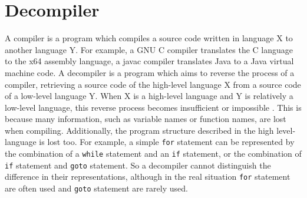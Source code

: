 \documentclass[senior,final,11pt]{iscs-thesis}
\begin{document}
\section{Decompiler}


A compiler is a program which compiles a source code written in language X to another language Y. 
For example, a GNU C compiler translates the C language to the x64 assembly language, a javac compiler translates Java to a Java virtual machine code.
A decompiler is a program which aims to reverse the process of a compiler, retrieving a source code of the high-level language X from a source code of a low-level language Y. 
When X is a high-level language and Y is relatively a low-level language, 
this reverse process becomes insufficient or impossible
\citep{hex_rays,decompile_hard_java}.
This is because many information, such as variable names or function names, are lost when compiling.
Additionally, the program structure described in the high level-language is lost too. 
For example, a simple \texttt{for} statement can be represented by the combination of a \texttt{while} statement and an \texttt{if} statement, or the combination of \texttt{if} statement and \texttt{goto} statement. 
So a decompiler cannot distinguish the difference in their representations, 
although in the real situation \texttt{for} statement are often used and \texttt{goto} statement are rarely used.





\end{document}
